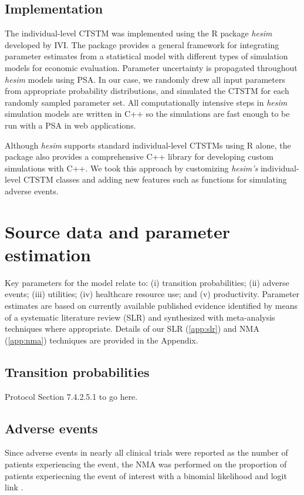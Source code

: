 \documentclass[11pt,final,fleqn]{article}\usepackage[]{graphicx}\usepackage[]{color}
\theoremstyle{plain}
\begin{document}
{\subsection{Implementation} 

The individual-level CTSTM was implemented using the R package \textit{hesim} developed by IVI. The package provides a general framework for integrating parameter estimates from a statistical model with different types of simulation models for economic evaluation. Parameter uncertainty is propagated throughout \textit{hesim} models using PSA. In our case, we randomly drew all input parameters from appropriate probability distributions, and simulated the CTSTM for each randomly sampled parameter set. All computationally intensive steps in \textit{hesim} simulation models are written in C++ so the simulations are fast enough to be run with a PSA in web applications. 


Although \textit{hesim} supports standard individual-level CTSTMs using R alone, the package also provides a comprehensive C++ library for developing custom simulations with C++. We took this approach by customizing \textit{hesim's} individual-level CTSTM classes and adding new features such as functions for simulating adverse events. 


\section{Source data and parameter estimation}\label{sec:data}
Key parameters for the model relate to: (i) transition probabilities; (ii) adverse events; (iii) utilities; (iv) healthcare resource use; and (v) productivity. Parameter estimates are based on currently available published evidence identified by means of a systematic literature review (SLR) and synthesized with meta-analysis techniques where appropriate. Details of our SLR (\autoref{app:slr}) and NMA (\autoref{app:nma})  techniques are provided in the Appendix. 

\subsection{Transition probabilities}\label{subsec:data-transprobs}
Protocol Section 7.4.2.5.1 to go here.

\subsection{Adverse events}\label{subsec:data-aes}
Since adverse events in nearly all clinical trials were reported as the number of patients experiencing the event, the NMA was performed on the proportion of patients experiecning the event of interest with a binomial likelihood and logit link \citep[Chapter~2]{dias2018network}.

}
\end{document}
